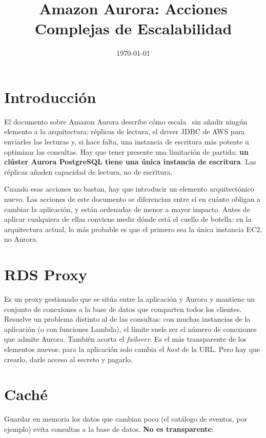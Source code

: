 \documentclass[12pt,a4paper]{article}
\title{Amazon Aurora: Acciones Complejas de Escalabilidad}
\date{\normalsize\today}
\begin{document}
\maketitle

\section{Introducción}

El documento sobre Amazon Aurora describe cómo escala \proyecto~sin añadir ningún elemento a la arquitectura: réplicas de lectura, el driver JDBC de AWS para enviarles las lecturas y, si hace falta, una instancia de escritura más potente u optimizar las consultas. Hay que tener presente una limitación de partida: \textbf{un clúster Aurora PostgreSQL tiene una única instancia de escritura}. Las réplicas añaden capacidad de lectura, no de escritura.

Cuando esas acciones no bastan, hay que introducir un elemento arquitectónico nuevo. Las acciones de este documento se diferencian entre sí en cuánto obligan a cambiar la aplicación, y están ordenadas de menor a mayor impacto. Antes de aplicar cualquiera de ellas conviene medir dónde está el cuello de botella: en la arquitectura actual, lo más probable es que el primero sea la única instancia EC2, no Aurora.

\section{RDS Proxy}

Es un proxy gestionado que se sitúa entre la aplicación y Aurora y mantiene un conjunto de conexiones a la base de datos que comparten todos los clientes. Resuelve un problema distinto al de las consultas: con muchas instancias de la aplicación (o con funciones Lambda), el límite suele ser el número de conexiones que admite Aurora. También acorta el \textit{failover}. Es el más transparente de los elementos nuevos: para la aplicación solo cambia el \textit{host} de la URL. Pero hay que crearlo, darle acceso al secreto y pagarlo.

\section{Caché}

Guardar en memoria los datos que cambian poco (el catálogo de eventos, por ejemplo) evita consultas a la base de datos. \textbf{No es transparente}:
\end{document}
